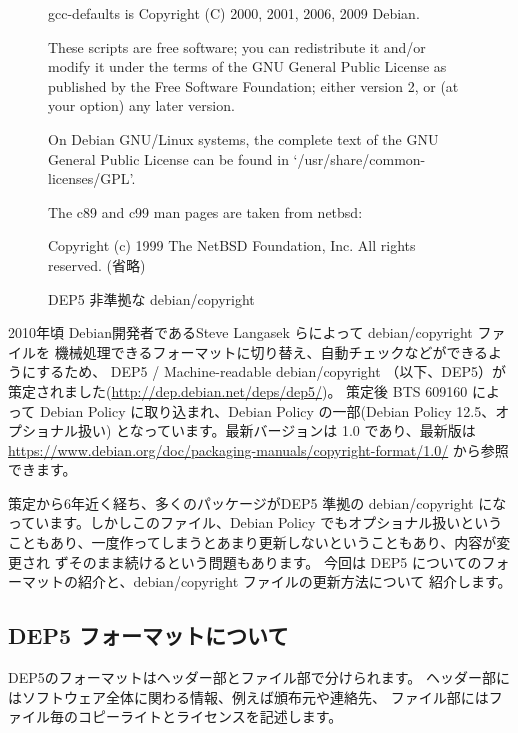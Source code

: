 \documentclass[mingoth,a4paper]{jsarticle}
\begin{document}
\begin{figure}[htbp]
\begin{center}
\begin{commandline}
gcc-defaults is Copyright (C) 2000, 2001, 2006, 2009 Debian.

These scripts are free software; you can redistribute it and/or modify it
under the terms of the GNU General Public License as published by the
Free Software Foundation; either version 2, or (at your option) any
later version.

On Debian GNU/Linux systems, the complete text of the GNU General
Public License can be found in `/usr/share/common-licenses/GPL'.

The c89 and c99 man pages are taken from netbsd:

Copyright (c) 1999 The NetBSD Foundation, Inc.
All rights reserved.
(省略)
\end{commandline}
\end{center}
\caption{DEP5 非準拠な debian/copyright}
\label{fig:non-dep5-copyright}
\end{figure}


2010年頃 Debian開発者であるSteve Langasek らによって debian/copyright ファイルを
機械処理できるフォーマットに切り替え、自動チェックなどができるようにするため、
DEP5 / Machine-readable debian/copyright （以下、DEP5）が策定されました(\url{http://dep.debian.net/deps/dep5/})。
策定後 BTS 609160 によって Debian Policy に取り込まれ、Debian Policy の一部(Debian Policy 12.5、オプショナル扱い)
となっています。最新バージョンは 1.0 であり、最新版は
\url{https://www.debian.org/doc/packaging-manuals/copyright-format/1.0/}
から参照できます。

策定から6年近く経ち、多くのパッケージがDEP5 準拠の debian/copyright
になっています。しかしこのファイル、Debian Policy でもオプショナル扱いという
こともあり、一度作ってしまうとあまり更新しないということもあり、内容が変更され
ずそのまま続けるという問題もあります。
今回は DEP5 についてのフォーマットの紹介と、debian/copyright ファイルの更新方法について
紹介します。

\subsection{DEP5 フォーマットについて}

DEP5のフォーマットはヘッダー部とファイル部で分けられます。
ヘッダー部にはソフトウェア全体に関わる情報、例えば頒布元や連絡先、
ファイル部にはファイル毎のコピーライトとライセンスを記述します。
\end{document}
